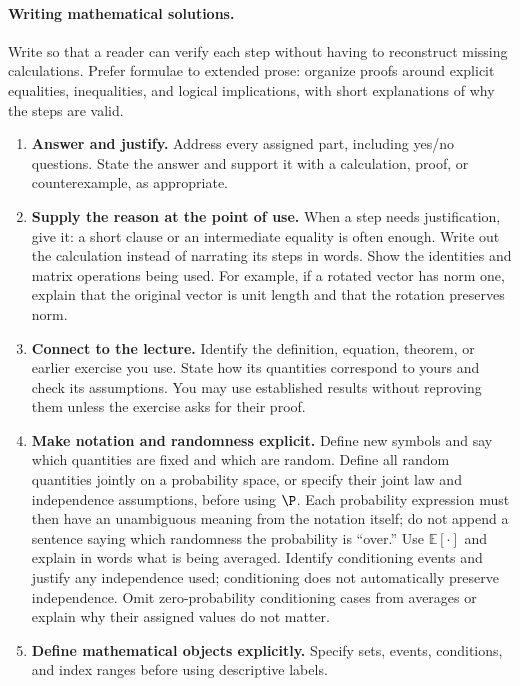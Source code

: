 \paragraph{Writing mathematical solutions.}
Write so that a reader can verify each step without having to reconstruct
missing calculations. Prefer formulae to extended prose: organize proofs
around explicit equalities, inequalities, and logical implications, with
short explanations of why the steps are valid.
\begin{enumerate}[leftmargin=*]
\item \textbf{Answer and justify.} Address every assigned part, including
yes/no questions. State the answer and support it with a calculation, proof,
or counterexample, as appropriate.
\item \textbf{Supply the reason at the point of use.} When a step needs
justification, give it: a short clause or an intermediate equality is often
enough. Write out the calculation instead of narrating its steps in words.
Show the identities and matrix operations being used. For example,
if a rotated vector has norm one, explain that the original vector is unit
length and that the rotation preserves norm.
\item \textbf{Connect to the lecture.} Identify the definition, equation,
theorem, or earlier exercise you use. State how its quantities correspond
to yours and check its assumptions. You may use established results without
reproving them unless the exercise asks for their proof.
\item \textbf{Make notation and randomness explicit.} Define new symbols
and say which quantities are fixed and which are random. Define all random
quantities jointly on a probability space, or specify their joint law and
independence assumptions, before using $\P$. Each probability expression must
then have an unambiguous meaning from the notation itself; do not append a
sentence saying which randomness the probability is ``over.'' Use
$\mathbb E[\cdot]$ and explain in words what is being averaged. Identify
conditioning events and justify any independence used; conditioning does
not automatically preserve independence. Omit zero-probability conditioning
cases from averages or explain why their assigned values do not matter.
\item \textbf{Define mathematical objects explicitly.} Specify sets,
events, conditions, and index ranges before using descriptive labels.

\end{enumerate}
